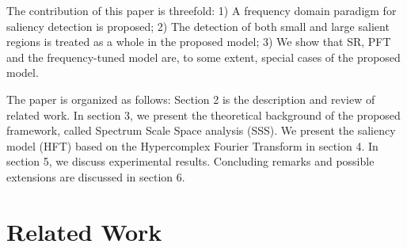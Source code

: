 \documentclass[10pt,journal,cspaper,compsoc]{IEEEtran}
\begin{document}
The contribution of this paper is threefold: 1) A frequency domain paradigm for saliency detection is proposed; 2) The detection of both small and large salient regions is treated as a whole in the proposed model; 3) We show that SR, PFT and the frequency-tuned model\cite{LCAV-CONF-2009-012} are, to some extent, special cases of the proposed model.

The paper is organized as follows: Section 2 is the description and review of related work. In section 3, we present the theoretical background of the proposed framework, called Spectrum Scale Space analysis (SSS). We present the saliency model (HFT) based on the Hypercomplex Fourier Transform in section 4. In section 5, we discuss experimental results. Concluding remarks and possible extensions are discussed in section 6.

\section{Related Work}
\label{relatedworks}
\end{document}
